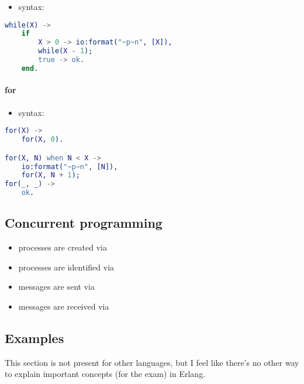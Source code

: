 \documentclass[a4paper,landscape,10pt]{article}
\begin{document}
\begin{multicols*}{2}
  \begin{itemize}
    \item syntax: 
  \end{itemize}

  \begin{lstlisting}[language=Erlang]
while(X) ->
    if
        X > 0 -> io:format("~p~n", [X]),
        while(X - 1);
        true -> ok.
    end.
  \end{lstlisting}

  \breakcolumn

  \paragraph{for}

  \begin{itemize}
    \item syntax: 
  \end{itemize}

  \begin{lstlisting}[language=Erlang]
for(X) ->
    for(X, 0).

for(X, N) when N < X ->
    io:format("~p~n", [N]),
    for(X, N + 1);
for(_, _) ->
    ok.
  \end{lstlisting}

  \subsection{Concurrent programming}

  \begin{itemize}
    \item processes are created via 
    \item processes are identified via 
    \item messages are sent via 
    \item messages are received via 
  \end{itemize}

  \subsection{Examples}

  This section is not present for other languages, but I feel like there's no other way to explain important concepts (for the exam) in Erlang.


\end{multicols*}
\end{document}
